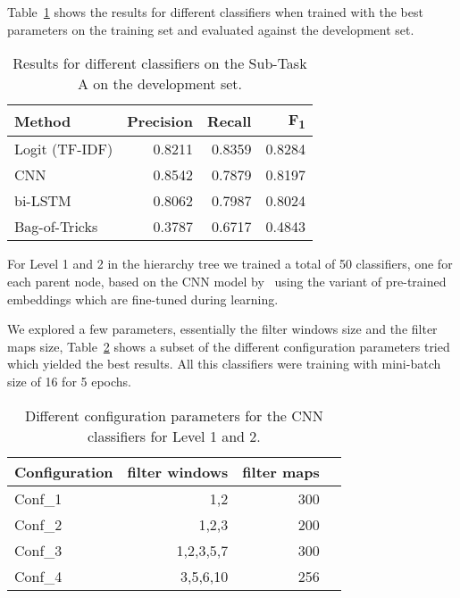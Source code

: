 \documentclass[11pt,a4paper]{article}
\begin{document}
Table~\ref{subtask_a_devset-results} shows the results for different classifiers
when trained with the best parameters on the training set and evaluated against
the development set.


\begin{table}[!h]
\begin{center}
\begin{tabular}{|l|r|r|r|}
\hline\centering\textbf{Method}  & \textbf{Precision} &  \textbf{Recall} &  \textbf{F\textsubscript{1}}\\
\hline
 Logit (TF-IDF) & 0.8211 & 0.8359 & 0.8284 \\
 CNN            & 0.8542 & 0.7879 & 0.8197 \\
 bi-LSTM        & 0.8062 & 0.7987 & 0.8024 \\
 Bag-of-Tricks  & 0.3787 & 0.6717 & 0.4843 \\
\hline
\end{tabular}
\end{center}
\caption{\label{subtask_a_devset-results} Results for different classifiers on the Sub-Task A on the development set.}
\end{table}


For Level 1 and 2 in the hierarchy tree we trained a total of 50 classifiers, one
for each parent node, based on the CNN model by~\citet{kim-2014-convolutional}
using the variant of pre-trained embeddings which are fine-tuned during learning.

We explored a few parameters, essentially the filter windows size and the filter
maps size, Table~\ref{subtask_b_parameters} shows a subset of the different
configuration parameters tried which yielded the best results. All this classifiers
 were training with mini-batch size of 16 for 5 epochs.

\begin{table}[!h]
\begin{center}
\begin{tabular}{|l|r|r|r|}
\hline\centering\textbf{Configuration}  & \textbf{filter windows} &  \textbf{filter maps} \\
\hline
 Conf\_1 & 1,2       & 300 \\
 Conf\_2 & 1,2,3     & 200 \\
 Conf\_3 & 1,2,3,5,7 & 300 \\
 Conf\_4 & 3,5,6,10  & 256 \\
\hline
\end{tabular}
\end{center}
\caption{\label{subtask_b_parameters} Different configuration parameters for the CNN classifiers for Level 1 and 2.}
\end{table}
\end{document}
